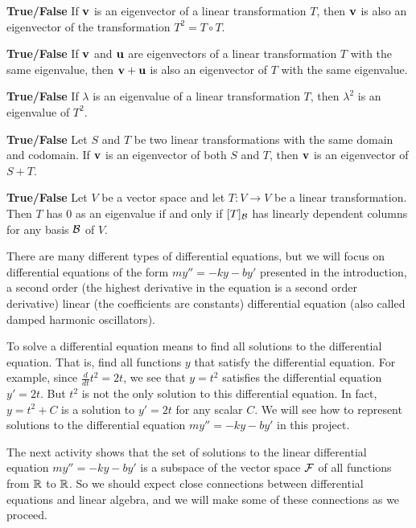 \item \textbf{True/False} If $\mathbf{v}$ is an eigenvector of a linear transformation $T$, then $\mathbf{v}$ is also an eigenvector of the transformation $T^2 = T \circ T$. 

\item \textbf{True/False} If $\mathbf{v}$ and $\mathbf{u}$ are eigenvectors of a linear transformation $T$ with the same eigenvalue, then $\mathbf{v}+\mathbf{u}$ is also an eigenvector of $T$ with the same eigenvalue.

\item \textbf{True/False} If $\lambda$ is an eigenvalue of a linear transformation $T$, then $\lambda^2$ is an eigenvalue of $T^2$.

\item \textbf{True/False} Let $S$ and $T$ be two linear transformations with the same domain and codomain.  If $\mathbf{v}$ is an eigenvector of both $S$ and $T$, then $\mathbf{v}$ is an eigenvector of $S+T$. 

\item \textbf{True/False} Let $V$ be a vector space and let $T : V \to V$ be a linear transformation. Then $T$ has 0 as an eigenvalue if and only if $[T]_{\mathcal{B}}$ has linearly dependent columns for any basis $\mathcal{B}$ of $V$.

\ea


\ee

\label{sec:proj_diff_eq}

There are many different types of differential equations, but we will focus on differential equations of the form $my'' = -ky-by'$ presented in the introduction, a second order (the highest derivative in the equation is a second order derivative) linear (the coefficients are constants) differential equation (also called damped harmonic oscillators).

To solve a differential equation means to find all solutions to the differential equation. That is, find all functions $y$ that satisfy the differential equation. For example, since $\frac{d}{dt} t^2 = 2t$, we see that $y = t^2$ satisfies the differential equation $y' = 2t$. But $t^2$ is not the only solution to this differential equation. In fact, $y = t^2 + C$ is a solution to $y' = 2t$ for any scalar $C$. We will see how to represent solutions to the differential equation $my'' = -ky-by'$ in this project. 

The next activity shows that the set of solutions to the linear differential equation $my'' = -ky-by'$ is a subspace of the vector space $\mathcal{F}$ of all functions from $\mathbb{R}$ to $\mathbb{R}$. So we should expect close connections between differential equations and linear algebra, and we will make some of these connections as we proceed. 


